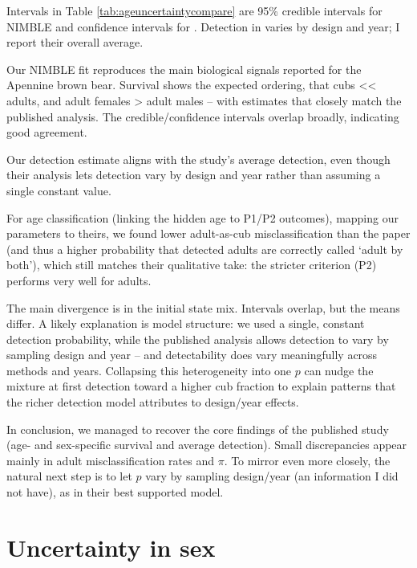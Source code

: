 \documentclass[
  12pt,
]{krantz}
\begin{document}
\justifying

Intervals in Table \ref{tab:ageuncertaintycompare} are 95\% credible intervals for NIMBLE and confidence intervals for \citet{Gervasi2017}. Detection in \citet{Gervasi2017} varies by design and year; I report their overall average.

Our NIMBLE fit reproduces the main biological signals reported for the Apennine brown bear. Survival shows the expected ordering, that cubs \textless\textless{} adults, and adult females \textgreater{} adult males -- with estimates that closely match the published analysis. The credible/confidence intervals overlap broadly, indicating good agreement.

Our detection estimate aligns with the study's average detection, even though their analysis lets detection vary by design and year rather than assuming a single constant value.

For age classification (linking the hidden age to P1/P2 outcomes), mapping our parameters to theirs, we found lower adult-as-cub misclassification than the paper (and thus a higher probability that detected adults are correctly called `adult by both'), which still matches their qualitative take: the stricter criterion (P2) performs very well for adults.

The main divergence is in the initial state mix. Intervals overlap, but the means differ. A likely explanation is model structure: we used a single, constant detection probability, while the published analysis allows detection to vary by sampling design and year -- and detectability does vary meaningfully across methods and years. Collapsing this heterogeneity into one \(p\) can nudge the mixture at first detection toward a higher cub fraction to explain patterns that the richer detection model attributes to design/year effects.

In conclusion, we managed to recover the core findings of the published study (age- and sex-specific survival and average detection). Small discrepancies appear mainly in adult misclassification rates and \(\pi\). To mirror \citet{Gervasi2017} even more closely, the natural next step is to let \(p\) vary by sampling design/year (an information I did not have), as in their best supported model.

\section{Uncertainty in sex}\label{uncertainty-in-sex}
\end{document}
